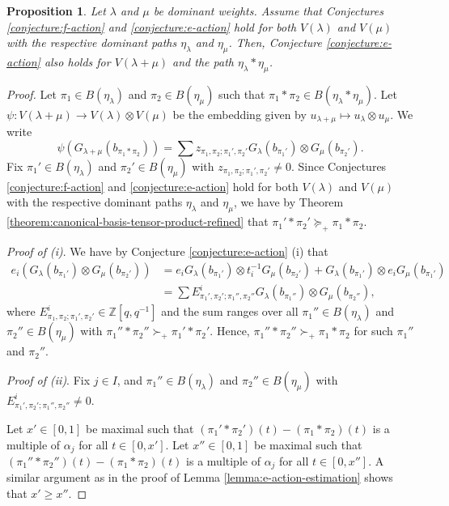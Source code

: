 \documentclass[final]{amsart}
\theoremstyle{plain}
\newtheorem{proposition}[corollary]{Proposition}
\theoremstyle{definition}
\newcommand{\bbZ}{\mathbb Z}
\begin{document}
\begin{proposition}
    \label{proposition:e-action-tensor-product}
    Let $\lambda$ and $\mu$ be dominant weights.
    Assume that Conjectures \ref{conjecture:f-action} and \ref{conjecture:e-action} hold for both $V(\lambda)$ and $V(\mu)$ with the respective dominant paths $\eta_\lambda$ and $\eta_\mu$.
    Then, Conjecture \ref{conjecture:e-action} also holds for $V(\lambda + \mu)$ and the path $\eta_\lambda * \eta_\mu$.
\end{proposition}
\begin{proof}
    Let $\pi_1 \in B(\eta_\lambda)$ and $\pi_2 \in B(\eta_\mu)$ such that $\pi_1 * \pi_2 \in B(\eta_\lambda * \eta_\mu)$.
    Let $\psi\colon V(\lambda + \mu) \to V(\lambda) \otimes V(\mu)$ be the embedding given by $u_{\lambda + \mu} \mapsto u_\lambda \otimes u_\mu$.
    We write
    \[
        \psi(G_{\lambda+\mu}(b_{\pi_1*\pi_2})) = \sum z_{\pi_1,\pi_2;\pi_1',\pi_2'} G_\lambda(b_{\pi_1'}) \otimes G_\mu(b_{\pi_2'}).
    \]
    Fix $\pi_1' \in B(\eta_\lambda)$ and $\pi_2' \in B(\eta_\mu)$ with $z_{\pi_1,\pi_2;\pi_1',\pi_2'} \neq 0$.
    Since Conjectures \ref{conjecture:f-action} and \ref{conjecture:e-action} hold for both $V(\lambda)$ and $V(\mu)$ with the respective dominant paths $\eta_\lambda$ and $\eta_\mu$, we have by Theorem \ref{theorem:canonical-basis-tensor-product-refined} that $\pi_1'*\pi_2' \succeq_+ \pi_1*\pi_2$.

    \emph{Proof of (i)}.
    We have by Conjecture \ref{conjecture:e-action} (i) that
    \begin{align*}
        e_i (G_\lambda(b_{\pi_1'}) \otimes G_\mu(b_{\pi_2'}))
        &= e_i G_\lambda(b_{\pi_1'}) \otimes t_i^{-1} G_\mu(b_{\pi_2'}) + G_\lambda(b_{\pi_1'}) \otimes e_i G_\mu(b_{\pi_1'}) \\
        &= \sum E_{\pi_1',\pi_2';\pi_1'',\pi_2''}^i G_\lambda(b_{\pi_1''}) \otimes G_\mu(b_{\pi_2''}),
    \end{align*}
    where $E_{\pi_1,\pi_2;\pi_1',\pi_2'}^i \in \bbZ[q, q^{-1}]$ and the sum ranges over all $\pi_1'' \in B(\eta_\lambda)$ and $\pi_2'' \in B(\eta_\mu)$ with $\pi_1''*\pi_2'' \succ_+ \pi_1'*\pi_2'$.
    Hence, $\pi_1''*\pi_2'' \succ_+ \pi_1*\pi_2$ for such $\pi_1''$ and $\pi_2''$.

    \emph{Proof of (ii)}.
    Fix $j \in I$, and $\pi_1'' \in B(\eta_\lambda)$ and $\pi_2'' \in B(\eta_\mu)$ with $E_{\pi_1',\pi_2';\pi_1'',\pi_2''}^i \neq 0$.

    Let $x' \in [0, 1]$ be maximal such that $(\pi_1'*\pi_2')(t) - (\pi_1*\pi_2)(t)$ is a multiple of $\alpha_j$ for all $t \in [0, x']$.
    Let $x'' \in [0, 1]$ be maximal such that $(\pi_1''*\pi_2'')(t) - (\pi_1*\pi_2)(t)$ is a multiple of $\alpha_j$ for all $t \in [0, x'']$.
    A similar argument as in the proof of Lemma \ref{lemma:e-action-estimation} shows that $x' \ge x''$.


\end{proof}
\end{document}
